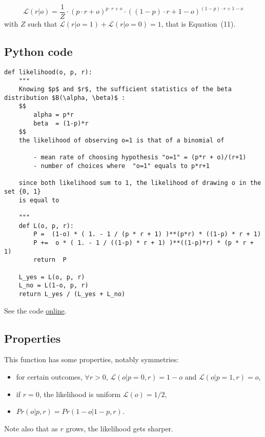 \documentclass[10pt,letterpaper]{article}
\newcommand{\eql}[1]{\begin{equation}#1\end{equation}}
\newcommand{\Ll}{\mathcal{L}}
\newcommand{\seeEq}[1]{Equation~\ref{eq:#1}}
\newcommand{\seeApp}[1]{Appendix~\ref{app:#1}}
\begin{document}
\eql{
\Ll(r | o) = \frac{1}{Z} \cdot {(p \cdot r + o)}^{p \cdot r + o} \cdot {((1- p)\cdot r + 1- o)}^{(1- p)\cdot r + 1- o}
}
with $Z$ such that $\Ll(r | o=1) + \Ll(r | o=0)=1$, that is Equation~(11). %

\subsection{Python code}

\begin{lstlisting}
def likelihood(o, p, r):
    """
    Knowing $p$ and $r$, the sufficient statistics of the beta distribution $B(\alpha, \beta)$ :
    $$
        alpha = p*r
        beta  = (1-p)*r
    $$
    the likelihood of observing o=1 is that of a binomial of

        - mean rate of choosing hypothesis "o=1" = (p*r + o)/(r+1)
        - number of choices where  "o=1" equals to p*r+1

    since both likelihood sum to 1, the likelihood of drawing o in the set {0, 1}
    is equal to

    """
    def L(o, p, r):
        P =  (1-o) * ( 1. - 1 / (p * r + 1) )**(p*r) * ((1-p) * r + 1)
        P +=  o * ( 1. - 1 / ((1-p) * r + 1) )**((1-p)*r) * (p * r + 1)
        return  P

    L_yes = L(o, p, r)
    L_no = L(1-o, p, r)
    return L_yes / (L_yes + L_no)

\end{lstlisting}

See the code \href{https://github.com/laurentperrinet/bayesianchangepoint/blob/master/bayesianchangepoint/bcp.py#L65}{online}.
\subsection{Properties}
This function has some properties, notably symmetries:
	\begin{itemize}
		\item for certain outcomes, $\forall r >0$, $\Ll(o|p=0, r)=1-o$ and $\Ll(o|p=1, r)=o$,
		\item if $r=0$, the likelihood is uniform $\Ll(o)=1/2$,
		\item $Pr(o | p, r)=Pr(1-o | 1-p, r)$.
	\end{itemize}

\noindent Note also that as $r$ grows, the likelihood gets sharper.




\end{document}
